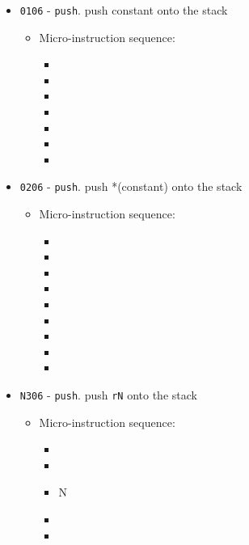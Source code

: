 \documentclass{article}
\begin{document}
\begin{itemize}
    \item \Verb|0106| - \Verb|push|. push constant onto the stack
    \begin{itemize}
        \item Micro-instruction sequence:
        \begin{itemize}
            \item \decrementsp
            \item \pkptroutinc
            \item \holddata
            \item \sptoaddr
            \item \writeRAM
            \item \incrementpk
            \item \done
        \end{itemize}
    \end{itemize}

    \item \Verb|0206| - \Verb|push|. push *(constant) onto the stack
    \begin{itemize}
        \item Micro-instruction sequence:
        \begin{itemize}
            \item \decrementsp
            \item \pkptroutinc
            \item \holddataaddr
            \item \readRAM
            \item \holddata
            \item \sptoaddr
            \item \writeRAM
            \item \incrementpk
            \item \done
        \end{itemize}
    \end{itemize}

    \item \Verb|N306| - \Verb|push|. push \Verb|rN| onto the stack
    \begin{itemize}
        \item Micro-instruction sequence:
        \begin{itemize}
            \item \decrementsp
            \item \sptoaddr
            \item \regtodata N
            \item \writeRAM
            \item \done
        \end{itemize}
    \end{itemize}


\end{itemize}
\end{document}
